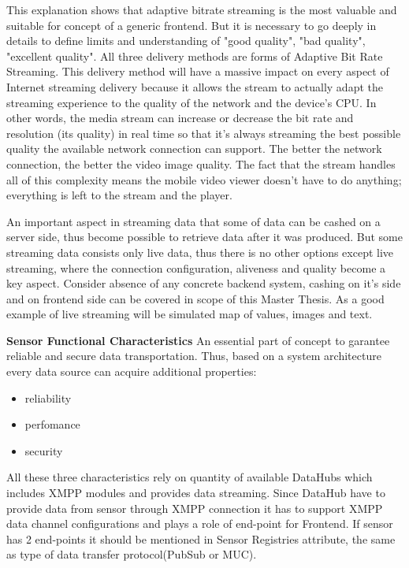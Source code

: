   \newline
  This explanation shows that adaptive bitrate streaming is the most valuable and suitable for concept of a generic frontend.
  But it is necessary to go deeply in details to define limits and understanding of "good quality", "bad quality", "excellent quality".
  All three delivery methods are forms of Adaptive Bit Rate Streaming. This delivery method will have a massive impact on every aspect of Internet streaming delivery because it allows the stream to actually adapt the streaming experience to the quality of the network and the device's CPU.
  \newline
  In other words, the media stream can increase or decrease the bit rate and resolution (its quality) in real time so that it’s always streaming the best possible quality the available network connection can support. The better the network connection, the better the video image quality. The fact that the stream handles all of this complexity means the mobile video viewer doesn’t have to do anything; everything is left to the stream and the player.

  An important aspect in streaming data that some of data can be cashed on a server side, thus become possible to retrieve data after it was produced. But some streaming data consists only live data, thus there is no other options except live streaming, where the connection configuration, aliveness and quality become a key aspect. Consider absence of any concrete backend system, cashing on it's side and on frontend side can be covered in scope of this Master Thesis. As a good example of live streaming will be simulated map of values, images and text.

  \textbf{Sensor Functional Characteristics}
  \newline
  An essential part of concept to garantee reliable and secure data transportation. Thus, based on a system architecture every data source can acquire additional properties:
  \begin{itemize}
  \item reliability
  \item perfomance
  \item security
  \end{itemize}
  All these three characteristics rely on quantity of available DataHubs which includes XMPP modules and provides data streaming. Since DataHub have to provide data from sensor through XMPP connection it has to support XMPP data channel configurations and plays a role of end-point for Frontend. If sensor has 2 end-points it should be mentioned in Sensor Registries attribute, the same as type of data transfer protocol(PubSub or MUC).

